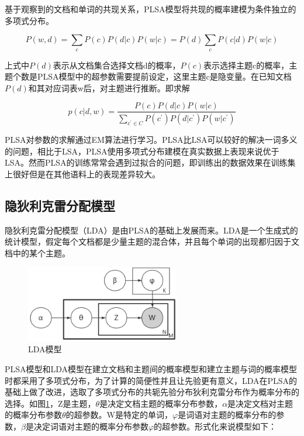 \documentclass[winfonts,master,oneside,nobackinfo]{njuthesis}
\begin{document}
基于观察到的文档和单词的共现关系，PLSA模型将共现的概率建模为条件独立的多项式分布。

$$P ( w , d ) = \sum _ { c } P ( c ) P ( d | c ) P ( w | c ) = P ( d ) \sum _ { c } P ( c | d ) P ( w | c )$$

上式中$P ( d )$表示从文档集合选择文档d的概率，$P ( c )$表示选择主题c的概率，主题个数是PLSA模型中的超参数需要提前设定，这里主题c是隐变量。在已知文档$P ( d )$和其对应词表w后，对主题进行推断。即求解

$$p ( c | d , w ) = \frac { P ( c ) P ( d | c ) P ( w | c ) } { \sum _ { c ^ { \prime } \in C } P \left( c ^ { \prime } \right) P ( d | c ^ { \prime } ) P ( w | c ^ { \prime } ) }$$

PLSA对参数的求解通过EM算法进行学习。PLSA比LSA可以较好的解决一词多义的问题，相比于LSA，PLSA使用多项式分布建模在真实数据上表现来说优于LSA。然而PLSA的训练常常会遇到过拟合的问题，即训练出的数据效果在训练集上很好但是在其他语料上的表现差异较大。

\subsection{隐狄利克雷分配模型}

隐狄利克雷分配模型（LDA）是由PLSA的基础上发展而来。LDA是一个生成式的统计模型，假定每个文档都是少量主题的混合体，并且每个单词的出现都归因于文档中的某个主题。

\begin{figure}[h]
\centering
\includegraphics[width=0.6\textwidth]{./figure/lda.jpg}
\caption{LDA模型}
\label{lda}
\end{figure}

PLSA模型和LDA模型在建立文档和主题间的概率模型和建立主题与词的概率模型时都采用了多项式分布，为了计算的简便性并且让先验更有意义，LDA在PLSA的基础上做了改进，选取了多项式分布的共轭先验分布狄利克雷分布作为概率分布的选择。如图\ref{lda}，Z是主题，$\theta$是决定文档主题的概率分布参数，$\alpha$是决定文档对主题的概率分布参数$\theta$的超参数。W是特定的单词，$\varphi$是词语对主题的概率分布的参数，$\beta$是决定词语对主题的概率分布参数$\varphi$的超参数。形式化来说模型如下：
\end{document}
